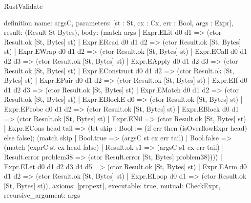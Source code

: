 \begin{lexlean}{RustValidate}
\begin{semanticmodule}
definition{
  name: argsC,
  parameters: [st : St, cx : Cx, err : Bool, args : Expr],
  result: (Result St Bytes),
  body: (match args
    | Expr.ELit d0 d1 => (ctor Result.ok [St, Bytes] st)
    | Expr.ERead d0 d1 d2 => (ctor Result.ok [St, Bytes] st)
    | Expr.EWrap d0 d1 d2 => (ctor Result.ok [St, Bytes] st)
    | Expr.ECall d0 d1 d2 d3 => (ctor Result.ok [St, Bytes] st)
    | Expr.EApply d0 d1 d2 d3 => (ctor Result.ok [St, Bytes] st)
    | Expr.EConstruct d0 d1 d2 => (ctor Result.ok [St, Bytes] st)
    | Expr.EPair d0 d1 d2 => (ctor Result.ok [St, Bytes] st)
    | Expr.EIf d0 d1 d2 d3 => (ctor Result.ok [St, Bytes] st)
    | Expr.EMatch d0 d1 d2 => (ctor Result.ok [St, Bytes] st)
    | Expr.EBlockE d0 => (ctor Result.ok [St, Bytes] st)
    | Expr.EProbe d0 d1 d2 => (ctor Result.ok [St, Bytes] st)
    | Expr.EBlock d0 d1 => (ctor Result.ok [St, Bytes] st)
    | Expr.ENil => (ctor Result.ok [St, Bytes] st)
    | Expr.ECons head tail => (let skip : Bool := (if err then (isOverflowExpr head) else false); (match skip
      | Bool.true => (argsC st cx err tail)
      | Bool.false => (match (exprC st cx head false)
        | Result.ok s1 => (argsC s1 cx err tail)
        | Result.error problem38 => (ctor Result.error [St, Bytes] problem38))))
    | Expr.ELet d0 d1 d2 d3 d4 d5 => (ctor Result.ok [St, Bytes] st)
    | Expr.EArm d0 d1 d2 => (ctor Result.ok [St, Bytes] st)
    | Expr.ELoop d0 d1 => (ctor Result.ok [St, Bytes] st)),
  axioms: [propext],
  executable: true,
  mutual: CheckExpr,
  recursive_argument: args
}


\end{semanticmodule}
\end{lexlean}
